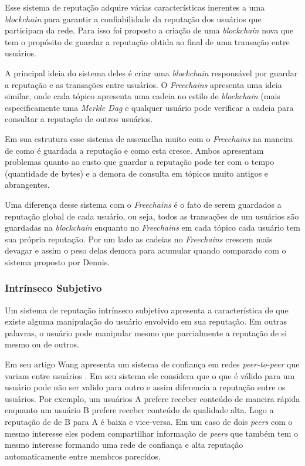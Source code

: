 \documentclass[12pt]{article}
\newcommand{\FC} {\emph{Freechains}\xspace}
\newcommand{\PtoP} {\emph{peer-to-peer}\xspace}
\begin{document}
Esse sistema de reputação adquire várias características inerentes a uma \emph{blockchain} para garantir a confiabilidade da reputação dos usuários que participam da rede. Para isso foi proposto a criação de uma \emph{blockchain} nova que tem o propósito de guardar a reputação obtida ao final de uma transação entre usuários.

A principal ideia do sistema deles é criar uma \emph{blockchain} responsável por guardar a reputação e as transações entre usuários. O \FC apresenta uma ideia similar, onde cada tópico apresenta uma cadeia no estilo de \emph{blockchain} (mais especificamente uma \emph{Merkle Dag} e qualquer usuário pode verificar a cadeia para consultar a reputação de outros usuários.

Em sua estrutura esse sistema de assemelha muito com o \FC na maneira de como é guardada a reputação e como esta cresce. Ambos apresentam problemas quanto ao custo que guardar a reputação pode ter com o tempo (quantidade de bytes) e a demora de consulta em tópicos muito antigos e abrangentes.

Uma diferença desse sistema com o \FC é o fato de serem guardados a reputação global de cada usuário, ou seja, todos as transações de um usuários são guardadas na \emph{blockchain} enquanto no \FC em cada tópico cada usuário tem sua própria reputação. Por um lado as cadeias no \FC crescem mais devagar e assim o peso delas demora para acumular quando comparado com o sistema proposto por Dennis.

\subsubsection{Intrínseco Subjetivo} \label{subsub:intsub}

Um sistema de reputação intrínseco subjetivo apresenta a característica de que existe alguma manipulação do usuário envolvido em sua reputação. Em outras palavras, o usuário pode manipular mesmo que parcialmente a reputação de si mesmo ou de outros.

Em seu artigo Wang apresenta um sistema de confiança em redes \PtoP que variam entre usuários \cite{1231515}. Em seu sistema ele considera que o que é válido para um usuário pode não ser valido para outro e assim diferencia a reputação entre os usuários. Por exemplo, um usuários A prefere receber conteúdo de maneira rápida enquanto um usuário B prefere receber conteúdo de qualidade alta. Logo a reputação de de B para A é baixa e vice-versa. Em um caso de dois \emph{peers} com o mesmo interesse eles podem compartilhar informação de \emph{peers} que também tem o mesmo interesse formando uma rede de confiança e alta reputação automaticamente entre membros parecidos.
\end{document}
